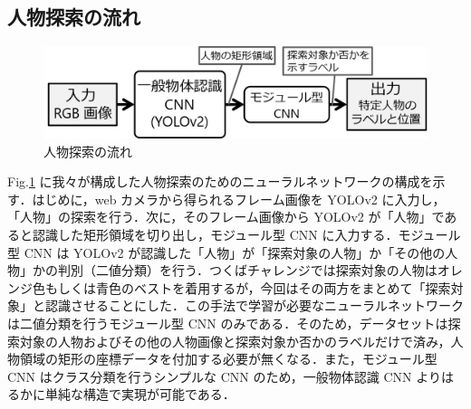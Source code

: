 \documentclass[twocolumn,10pt]{jarticle}
\begin{document}
\subsection{人物探索の流れ}
\begin{figure}[t]
\centering
 \includegraphics[scale=0.37]{fig/method.png}
 \caption{人物探索の流れ}
 \label{fig:method}
\end{figure}
Fig.\ref{fig:method} に我々が構成した人物探索のためのニューラルネットワークの構成を示す．はじめに，web カメラから得られるフレーム画像を YOLOv2 に入力し，「人物」の探索を行う．次に，そのフレーム画像から YOLOv2  が「人物」であると認識した矩形領域を切り出し，モジュール型 CNN に入力する．モジュール型 CNN は YOLOv2 が認識した「人物」が「探索対象の人物」か「その他の人物」かの判別（二値分類）を行う．つくばチャレンジでは探索対象の人物はオレンジ色もしくは青色のベストを着用するが，今回はその両方をまとめて「探索対象」と認識させることにした．この手法で学習が必要なニューラルネットワークは二値分類を行うモジュール型 CNN のみである．そのため，データセットは探索対象の人物およびその他の人物画像と探索対象か否かのラベルだけで済み，人物領域の矩形の座標データを付加する必要が無くなる．また，モジュール型 CNN はクラス分類を行うシンプルな CNN のため，一般物体認識 CNN よりはるかに単純な構造で実現が可能である．
\end{document}
